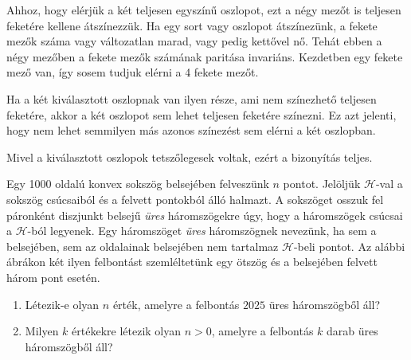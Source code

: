 \begin{solution}
Ahhoz, hogy elérjük a két teljesen egyszínű oszlopot, ezt a négy mezőt  is teljesen feketére kellene átszínezzük. Ha egy sort vagy oszlopot átszínezünk, a fekete mezők száma vagy változatlan marad, vagy pedig kettővel nő. Tehát ebben a négy mezőben a fekete mezők számának paritása invariáns. Kezdetben egy fekete mező van, így sosem tudjuk elérni a 4 fekete mezőt. 

Ha a két kiválasztott oszlopnak van ilyen része, ami nem színezhető teljesen feketére, akkor a két oszlopot sem lehet teljesen feketére  színezni. Ez azt jelenti, hogy nem lehet semmilyen más azonos színezést sem elérni a két oszlopban. 

Mivel a kiválasztott oszlopok tetszőlegesek voltak, ezért a bizonyítás teljes.
\end{solution}
\begin{problem}
 Egy 1000 oldalú konvex sokszög belsejében felveszünk \(n\) pontot. Jelöljük \(\mathcal{H}\)-val a sokszög csúcsaiból és a felvett pontokból álló halmazt. A sokszöget osszuk fel páronként diszjunkt belsejű \textit{üres} háromszögekre úgy, hogy a háromszögek csúcsai a \(\mathcal{H}\)-ból legyenek. Egy háromszöget \textit{üres} háromszögnek nevezünk, ha sem a belsejében, sem az oldalainak belsejében nem tartalmaz \(\mathcal{H}\)-beli pontot. Az alábbi ábrákon két ilyen felbontást szemléltetünk egy ötszög és a belsejében felvett három pont esetén.

  \begin{enumerate}
    \item Létezik-e olyan \(n\) érték, amelyre a felbontás \(2025\) üres háromszögből áll?
    \item Milyen \(k\) értékekre létezik olyan \(n>0\), amelyre a felbontás \(k\) darab üres háromszögből áll? 
\end{enumerate}


\end{problem}
